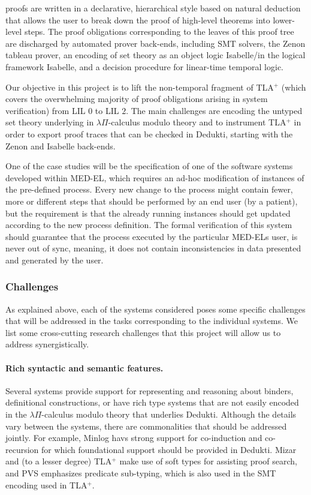 \tlaplus proofs are written in a declarative, hierarchical style based on
natural deduction that allows the user to break down the proof of high-level
theorems into lower-level steps. The proof obligations corresponding to the
leaves of this proof tree are discharged by automated prover back-ends,
including SMT solvers, the Zenon tableau prover, an encoding of \tlaplus set
theory as an object logic Isabelle/\tlaplus in the logical framework Isabelle,
and a decision procedure for linear-time temporal logic.

Our objective in this project is to lift the non-temporal fragment of
TLA$^+$ (which covers the overwhelming majority of proof obligations
arising in system verification) from LIL $0$ to LIL $2$. The main
challenges are encoding the untyped set theory underlying \tlaplus in
$\lambda\Pi$-calculus modulo theory and to instrument TLA$^+$ in order
to export proof traces that can be checked in Dedukti, starting with
the Zenon and Isabelle back-ends.

One of the case studies will be the specification of one of the software
systems developed within MED-EL, which requires an ad-hoc modification of
instances of the pre-defined process. Every new change to the process might
contain fewer, more or different steps that should be performed by an end user
(by a patient), but the requirement is that the already running instances
should get updated according to the new process definition. The formal
verification of this system should guarantee that the process executed by the
particular MED-ELs user, is never out of sync, meaning, it does not contain
inconsistencies in data presented and generated by the user.

\subsubsection*{Challenges}

As explained above, each of the systems considered poses some specific
challenges that will be addressed in the tasks corresponding to the
individual systems. We list some cross-cutting research challenges
that this project will allow us to address synergistically.

\paragraph*{Rich syntactic and semantic features.}
Several systems provide support for representing and reasoning about
binders, definitional constructions, or have rich type systems that
are not easily encoded in the $\lambda\Pi$-calculus modulo theory that
underlies Dedukti.  Although the details vary between the systems,
there are commonalities that should be addressed jointly. For example,
Minlog havs strong support for co-induction and co-recursion
for which foundational support should be provided in Dedukti. Mizar
and (to a lesser degree) TLA$^+$ make use of soft types for assisting
proof search, and PVS emphasizes predicate sub-typing, which is also
used in the SMT encoding used in TLA$^+$.

